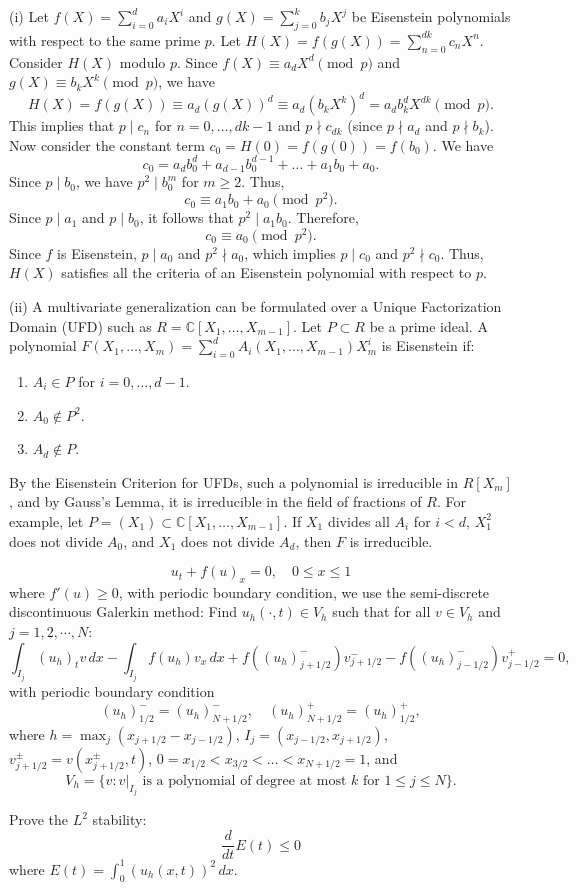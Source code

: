 \begin{solution}
(i) Let $f(X) = \sum_{i=0}^d a_i X^i$ and $g(X) = \sum_{j=0}^k b_j X^j$ be Eisenstein polynomials with respect to the same prime $p$. Let $H(X) = f(g(X)) = \sum_{n=0}^{dk} c_n X^n$.
Consider $H(X)$ modulo $p$. Since $f(X) \equiv a_d X^d \pmod p$ and $g(X) \equiv b_k X^k \pmod p$, we have
\[
H(X) = f(g(X)) \equiv a_d (g(X))^d \equiv a_d (b_k X^k)^d = a_d b_k^d X^{dk} \pmod p.
\]
This implies that $p \mid c_n$ for $n = 0, \dots, dk-1$ and $p \nmid c_{dk}$ (since $p \nmid a_d$ and $p \nmid b_k$).
Now consider the constant term $c_0 = H(0) = f(g(0)) = f(b_0)$. We have
\[
c_0 = a_d b_0^d + a_{d-1} b_0^{d-1} + \dots + a_1 b_0 + a_0.
\]
Since $p \mid b_0$, we have $p^2 \mid b_0^m$ for $m \geq 2$. Thus,
\[
c_0 \equiv a_1 b_0 + a_0 \pmod{p^2}.
\]
Since $p \mid a_1$ and $p \mid b_0$, it follows that $p^2 \mid a_1 b_0$. Therefore,
\[
c_0 \equiv a_0 \pmod{p^2}.
\]
Since $f$ is Eisenstein, $p \mid a_0$ and $p^2 \nmid a_0$, which implies $p \mid c_0$ and $p^2 \nmid c_0$. Thus, $H(X)$ satisfies all the criteria of an Eisenstein polynomial with respect to $p$.

(ii) A multivariate generalization can be formulated over a Unique Factorization Domain (UFD) such as $R = \mathbb{C}[X_1, \dots, X_{m-1}]$. Let $P \subset R$ be a prime ideal. A polynomial $F(X_1, \dots, X_m) = \sum_{i=0}^d A_i(X_1, \dots, X_{m-1}) X_m^i$ is Eisenstein if:
\begin{enumerate}
    \item $A_i \in P$ for $i=0, \dots, d-1$.
    \item $A_0 \notin P^2$.
    \item $A_d \notin P$.
\end{enumerate}
By the Eisenstein Criterion for UFDs, such a polynomial is irreducible in $R[X_m]$, and by Gauss's Lemma, it is irreducible in the field of fractions of $R$. For example, let $P = (X_1) \subset \mathbb{C}[X_1, \dots, X_{m-1}]$. If $X_1$ divides all $A_i$ for $i < d$, $X_1^2$ does not divide $A_0$, and $X_1$ does not divide $A_d$, then $F$ is irreducible.
\end{solution}

\begin{exercise}
\label{applied:2014:3}
\[
u_{t}+f(u)_{x}=0,\quad 0\leq x\leq 1
\]
where $f'(u)\geq 0$, with periodic boundary condition, we use the semi-discrete discontinuous Galerkin method: Find $u_{h}(\cdot,t)\in V_{h}$ such that for all $v\in V_{h}$ and $j=1,2,\cdots,N$:
\[
\int_{I_{j}}(u_{h})_{t}v\,dx-\int_{I_{j}}f(u_{h})v_{x}\,dx+f((u_{h})_{j+1/2}^{-})v_{j+1/2}^{-}-f((u_{h})_{j-1/2}^{-})v_{j-1/2}^{+}=0,
\]
with periodic boundary condition
\[
(u_{h})_{1/2}^{-}=(u_{h})_{N+1/2}^{-},\quad (u_{h})_{N+1/2}^{+}=(u_{h})_{1/2}^{+},
\]
where $h=\max_{j}(x_{j+1/2}-x_{j-1/2})$, $I_{j}=(x_{j-1/2},x_{j+1/2})$, $v_{j+1/2}^{\pm}=v(x_{j+1/2}^{\pm},t)$, $0=x_{1/2}<x_{3/2}<\dots<x_{N+1/2}=1$, and
\[
V_{h}=\{v:v|_{I_{j}}\text{ is a polynomial of degree at most }k\text{ for }1\leq j\leq N\}.
\]

Prove the $L^{2}$ stability:
\[
\frac{d}{dt}E(t)\leq 0
\]
where $E(t)=\int_{0}^{1}(u_{h}(x,t))^{2}\,dx$.
\end{exercise}

